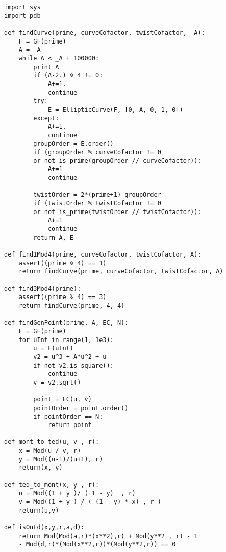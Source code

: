 \begin{lstlisting}
import sys
import pdb

def findCurve(prime, curveCofactor, twistCofactor, _A):
	F = GF(prime)
	A = _A
	while A < _A + 100000:
		print A
		if (A-2.) % 4 != 0:
			A+=1.
			continue
		try:
			E = EllipticCurve(F, [0, A, 0, 1, 0])
		except:
			A+=1.
			continue
		groupOrder = E.order()
		if (groupOrder % curveCofactor != 0
		or not is_prime(groupOrder // curveCofactor)):
			A+=1
			continue

		twistOrder = 2*(prime+1)-groupOrder
		if (twistOrder % twistCofactor != 0
		or not is_prime(twistOrder // twistCofactor)):
			A+=1
			continue
		return A, E

def find1Mod4(prime, curveCofactor, twistCofactor, A):
	assert((prime % 4) == 1)
	return findCurve(prime, curveCofactor, twistCofactor, A)
	
def find3Mod4(prime):
	assert((prime % 4) == 3)
	return findCurve(prime, 4, 4)

def findGenPoint(prime, A, EC, N):
	F = GF(prime)
	for uInt in range(1, 1e3):
		u = F(uInt)
		v2 = u^3 + A*u^2 + u
		if not v2.is_square():
			continue
		v = v2.sqrt()
	
		point = EC(u, v)
		pointOrder = point.order()
		if pointOrder == N:
			return point

def mont_to_ted(u, v , r):
	x = Mod(u / v, r) 
	y = Mod((u-1)/(u+1), r) 
	return(x, y)

def ted_to_mont(x, y , r):
	u = Mod((1 + y )/ ( 1 - y)  , r)
	v = Mod((1 + y ) / ( (1 - y) * x) , r ) 
	return(u,v)

def isOnEd(x,y,r,a,d):
	return Mod(Mod(a,r)*(x**2),r) + Mod(y**2 , r) - 1 
	- Mod(d,r)*(Mod(x**2,r))*(Mod(y**2,r)) == 0 
\end{lstlisting}
